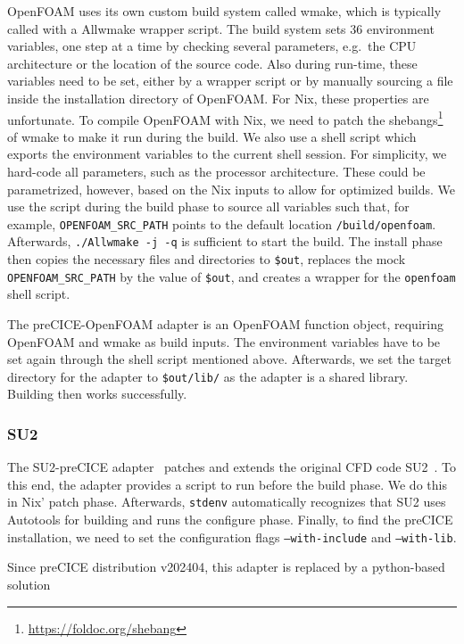 \documentclass{eceasst}
\begin{document}
OpenFOAM uses its own custom build system called wmake, which is typically called with a Allwmake wrapper script.
The build system sets 36 environment variables, one step at a time by checking several parameters, e.g.~the CPU architecture or the location of the source code. Also during run-time, these variables need to be set, either by a wrapper script or by manually sourcing a file inside the installation directory of OpenFOAM.
For Nix, these properties are unfortunate. To compile OpenFOAM with Nix, we need to patch the shebangs\footnote{\url{https://foldoc.org/shebang}} of wmake to make it run during the build.
We also use a shell script which exports the environment variables to the current shell session.
For simplicity, we hard-code all parameters, such as the processor architecture. These could be parametrized, however, based on the Nix inputs to allow for optimized builds. We use the script during the build phase to source all variables such that, for example, \texttt{OPENFOAM\_SRC\_PATH} points to the default location \texttt{/build/openfoam}.
Afterwards, \texttt{./Allwmake -j -q} is sufficient to start the build.
The install phase then copies the necessary files and directories to \texttt{\$out}, replaces the mock \texttt{OPENFOAM\_SRC\_PATH} by the value of \texttt{\$out}, and creates a wrapper for the \texttt{openfoam} shell script.

The preCICE-OpenFOAM adapter is an OpenFOAM function object, requiring OpenFOAM and wmake as build inputs.
The environment variables have to be set again through the shell script mentioned above.
Afterwards, we set the target directory for the adapter to \texttt{\$out/lib/} as the adapter is a shared library. Building then works successfully.

\subsubsection{SU2}

The SU2-preCICE adapter~\cite{Uekermann2017_Adapters} patches and extends the original CFD code SU2~\cite{su2}.
To this end, the adapter provides a script to run before the build phase.
We do this in Nix' patch phase. Afterwards, \texttt{stdenv} automatically recognizes that SU2 uses Autotools for building and runs the configure phase.
Finally, to find the preCICE installation, we need to set the configuration flags \texttt{--with-include} and \texttt{--with-lib}.

Since preCICE distribution v202404, this adapter is replaced by a python-based solution
\end{document}
